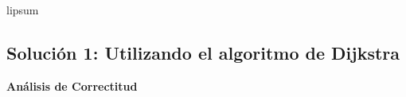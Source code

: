 \documentclass[
10pt, %
a4paper, %
oneside, %
headinclude,footinclude, %
BCOR5mm, %
]{scrartcl}
\begin{document}
lipsum

\subsection{Solución 1: Utilizando el algoritmo de Dijkstra}



\textbf{Análisis de Correctitud}





 











\renewcommand{\refname}{\spacedlowsmallcaps{References}} %




\end{document}
